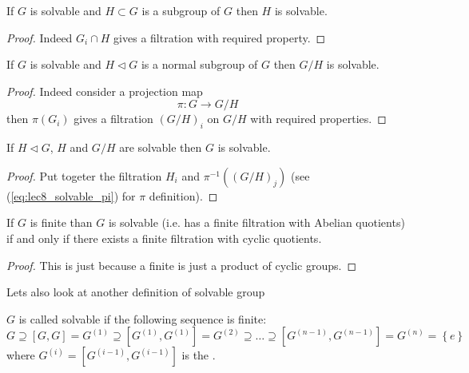\begin{property}
  If $G$ is solvable and $H \subset G$ is a subgroup of $G$ then $H$
  is solvable.
  \begin{proof}
    Indeed $G_i \cap H$ gives a filtration with required property.
  \end{proof}
  \label{property:lec8_solvable1}
\end{property}

\begin{property}
  If $G$ is solvable and $H \triangleleft G$ is a normal subgroup of
  $G$ then $G/H$ is solvable.
  \begin{proof}
    Indeed consider a projection map
    \begin{equation}
      \pi: G \to G/H
      \label{eq:lec8_solvable_pi}
    \end{equation}
    then $\pi\left(G_i\right)$ gives a filtration $\left(G/H\right)_i$
    on $G/H$ with required properties.
  \end{proof}
  \label{property:lec8_solvable2}
\end{property}

\begin{property}
  If $H \triangleleft G$, $H$ and $G/H$ are solvable then $G$ is
  solvable. 
  \begin{proof}
    Put togeter the filtration $H_i$ and
    $\pi^{-1}\left(\left(G/H\right)_j\right)$ (see
    (\ref{eq:lec8_solvable_pi}) for $\pi$ definition).
  \end{proof}
  \label{property:lec8_solvable3}
\end{property}

\begin{property}
  If $G$ is finite than $G$ is solvable (i.e. has a finite filtration with
  Abelian quotients) if and only if there exists a
  finite filtration with cyclic quotients.
  \begin{proof}
    This is just because a finite  is just a
    product of cyclic groups.
  \end{proof}
  \label{property:lec8_solvable4}
\end{property}

Lets also look at another definition of solvable group
\begin{definition}
  $G$ is called solvable if the following sequence is finite:
  \[
  G
  \supseteq \left[G, G\right] = G^{(1)}
  \supseteq \left[G^{(1)}, G^{(1)}\right] = G^{(2)}
  \supseteq \dots \supseteq
  \left[G^{(n-1)}, G^{(n-1)}\right] = G^{(n)} = \left\{e\right\}
  \]
  where $G^{(i)} = \left[G^{(i-1)}, G^{(i-1)}\right]$ is the
  .
  \label{def:solvablegroupadd}
\end{definition}

